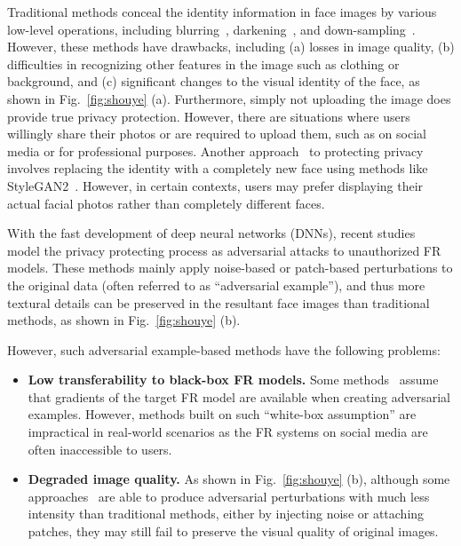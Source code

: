 \documentclass[10pt,journal,compsoc]{IEEEtran}
\begin{document}
Traditional methods conceal the identity information in face images by various low-level operations, including blurring~\cite{yang2022study}, darkening~\cite{wilber2016can}, and down-sampling~\cite{ryoo2017privacy}. However, these methods have drawbacks, including (a) losses in image quality, (b) difficulties in recognizing other features in the image such as clothing or background, and (c) significant changes to the visual identity of the face, as shown in Fig.~\ref{fig:shouye} (a).
Furthermore, simply not uploading the image does provide true privacy protection. However, there are situations where users willingly share their photos or are required to upload them, such as on social media or for professional purposes. Another approach~\cite{zhu2021one,xu2022high,xu2022styleswap} to protecting privacy involves replacing the identity with a completely new face using methods like StyleGAN2~\cite{karras2020analyzing}. However, in certain contexts, users may prefer displaying their actual facial photos rather than completely different faces.

With the fast development of deep neural networks (DNNs), recent studies~\cite{rajabi2021practicality,cherepanova2021lowkey,yang2021towards} model the privacy protecting process as adversarial attacks to unauthorized FR models. These methods mainly apply noise-based or patch-based perturbations to the original data (often referred to as ``adversarial example''), and thus more textural details can be preserved in the resultant face images than traditional methods, as shown in Fig.~\ref{fig:shouye} (b). 

However, such adversarial example-based methods have the following problems:
\begin{itemize}
\item \textbf{Low transferability to black-box FR models.}
Some methods~\cite{goodfellow2014explaining,brown2017adversarial,madry2017towards} assume that gradients of the target FR model are available when creating adversarial examples. However, methods built on such ``white-box assumption'' are impractical in real-world scenarios as the FR systems on social media are often inaccessible to users.

\item \textbf{Degraded image quality.}
As shown in Fig.~\ref{fig:shouye} (b), although some approaches~\cite{kurakin2017adversarial,dong2018boosting} are able to produce adversarial perturbations with much less intensity than traditional methods, either by injecting noise or attaching patches, they may still fail to preserve the visual quality of original images. 
\end{itemize}
\end{document}

